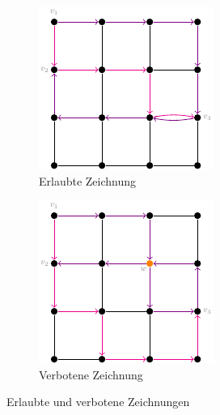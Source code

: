 \documentclass[bachelor, german]{algothesis}
\begin{document}
\begin{figure}[H]
    \centering
    \begin{subfigure}[b]{0.45\textwidth}
        \centering
        \includegraphics[width=\textwidth]{figures/Erlaubt.pdf}
        \caption{Erlaubte Zeichnung}
        \label{fig:erlaubt}
    \end{subfigure}
    \hfill
    \begin{subfigure}[b]{0.45\textwidth}
        \centering
        \includegraphics[width=\textwidth]{figures/Unerlaubt.pdf}
        \caption{Verbotene Zeichnung}
        \label{fig:unerlaubt}
    \end{subfigure}
    \hfill
    \caption{Erlaubte und verbotene Zeichnungen}
    \label{fig:Grid_Example}
\end{figure}
\end{document}
